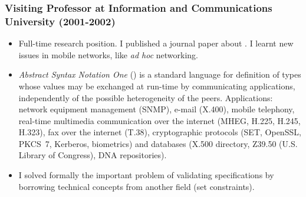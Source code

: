 \documentclass[compress,dvips,xcolor={dvipsnames},t]{beamer}
\begin{document}
%
\begin{frame}
\frametitle{Visiting Professor at Information and Communications University (2001-2002)}

\vspace*{-5pt}

\begin{itemize}

  \item Full-time research position. I published a journal paper about
  \ASN. I learnt new issues in mobile networks, like \emph{ad hoc}
  networking.

  \item \emph{Abstract Syntax Notation One} (\ASN) is a standard
  language for definition of types whose values may be exchanged at
  run-time by communicating applications, independently of the
  possible heterogeneity of the peers. Applications: network equipment
  management (SNMP), e-mail (X.400), mobile telephony, real-time
  multimedia communication over the internet (MHEG, H.225, H.245,
  H.323), fax over the internet (T.38), cryptographic protocols (SET,
  OpenSSL, PKCS~7, Kerberos, biometrics) and databases (X.500
  directory, Z39.50 (U.S. Library of Congress), DNA repositories).

  \item I solved formally the important problem of validating \ASN
  specifications by borrowing technical concepts from another field
  (set constraints).

\end{itemize}

\end{frame}
\end{document}
